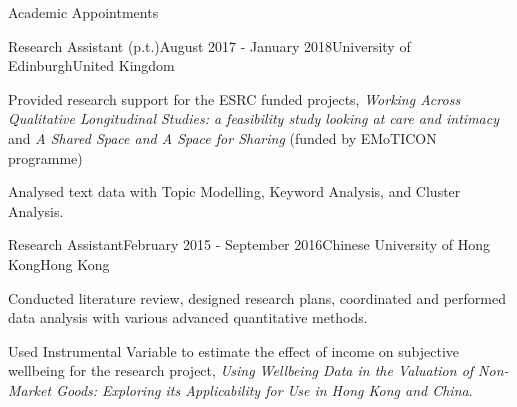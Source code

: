 \documentclass{resume} %
\begin{document}
\begin{rSection}{Academic Appointments}

\begin{rSubsection}{Research Assistant (p.t.)}{August 2017 - January 2018}{University of Edinburgh}{United Kingdom}
\item Provided research support for the ESRC funded projects, \textit{Working Across Qualitative Longitudinal Studies: a feasibility study looking at care and intimacy} and \textit{A Shared Space and A Space for Sharing} (funded by EMoTICON programme)
\item Analysed text data with Topic Modelling, Keyword Analysis, and Cluster Analysis.
\end{rSubsection}

\begin{rSubsection}{Research Assistant}{February 2015 - September 2016}{Chinese University of Hong Kong}{Hong Kong}
\item Conducted literature review, designed research plans, coordinated and performed data analysis with various advanced quantitative methods.
\item Used Instrumental Variable to estimate the effect of income on subjective wellbeing for the research project, \textit{Using Wellbeing Data in the Valuation of Non-Market Goods: Exploring its Applicability for Use in Hong Kong and China}.

\end{rSubsection}

\end{rSection}

\end{document}
